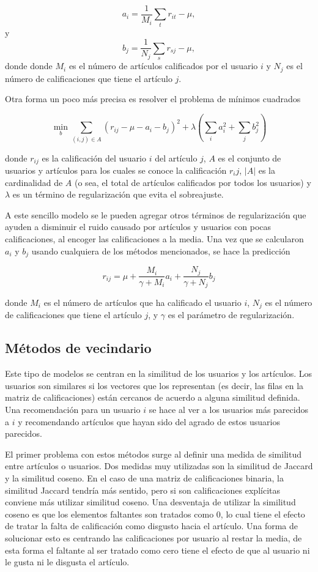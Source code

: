 \[
a_i = \frac{1}{M_i} \sum_t r_{it} - \mu,
\]
y 
\[
b_j = \frac{1}{N_j} \sum_s r_{sj} - \mu,
\]
donde donde $M_i$ es el número de artículos calificados por el usuario $i$ y $N_j$ es el número de calificaciones que tiene el artículo $j$.

Otra forma un poco más precisa es resolver el problema de mínimos cuadrados

\[
\min_{b} \sum_{(i, j) \in A} \left( r_{ij} - \mu - a_i - b_j \right) ^2 + \lambda \left( \sum_{i} a_i^2 + \sum_{j} b_j^2 \right)
\]

donde $r_{ij}$ es la calificación del usuario $i$ del artículo $j$, $A$ es el conjunto de usuarios y artículos para los cuales se conoce la calificación $r_ij$, $ \vert A \vert$ es la cardinalidad de $A$ (o sea, el total de artículos calificados por todos los usuarios) y $\lambda$ es un término de regularización que evita el sobreajuste.

A este sencillo modelo se le pueden agregar otros términos de regularización que ayuden a disminuir el ruido causado por artículos y usuarios con pocas calificaciones, al encoger las calificaciones a la media. Una vez que se calcularon $a_i$ y $b_j$ usando cualquiera de los métodos mencionados, se hace la predicción

\[
r_{ij} = \mu + \frac{M_i}{\gamma + M_i} a_i + \frac{N_j}{\gamma + N_j}b_j
\]

donde $M_i$ es el número de artículos que ha calificado el usuario $i$, $N_j$ es el número de calificaciones que tiene el artículo $j$, y $\gamma$ es el parámetro de regularización.

\subsection{Métodos de vecindario}

Este tipo de modelos se centran en la similitud de los usuarios y los artículos. Los usuarios son similares si los vectores que los representan (es decir, las filas en la matriz de calificaciones) están cercanos de acuerdo a alguna similitud definida. Una recomendación para un usuario $i$ se hace al ver a los usuarios más parecidos a $i$ y recomendando artículos que hayan sido del agrado de estos usuarios parecidos.

El primer problema con estos métodos surge al definir una medida de similitud entre artículos o usuarios. Dos medidas muy utilizadas son la similitud de Jaccard y la similitud coseno. En el caso de una matriz de calificaciones binaria, la similitud Jaccard tendría más sentido, pero si son calificaciones explícitas conviene más utilizar similitud coseno. Una desventaja de utilizar la similitud coseno es que los elementos faltantes son tratados como $0$, lo cual tiene el efecto de tratar la falta de calificación como disgusto hacia el artículo. Una forma de solucionar esto es centrando las calificaciones por usuario al restar la media, de esta forma el faltante al ser tratado como cero tiene el efecto de que al usuario ni le gusta ni le disgusta el artículo.

